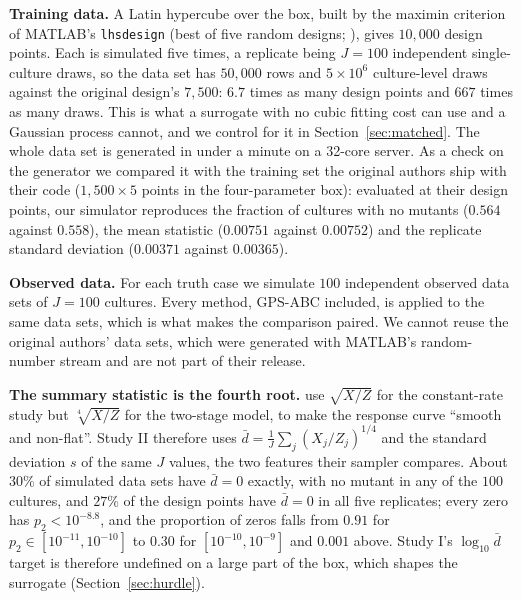 \documentclass[sn-basic,iicol,pdflatex]{sn-jnl}
\begin{document}
\noindent\textbf{Training data.} A Latin hypercube over the box, built by the
maximin criterion of MATLAB's \texttt{lhsdesign} (best of five random designs; \citealp{mckay1979}), gives
$10{,}000$ design points. Each is simulated five times, a replicate being $J=100$
independent single-culture draws, so the data set has $50{,}000$ rows and $5\times10^{6}$
culture-level draws against the original design's $7{,}500$: $6.7$ times as many
design points and $667$ times as many draws. This is what a surrogate with no
cubic fitting cost can use and a Gaussian process cannot, and we control for it
in Section~\ref{sec:matched}. The whole data set is generated in under a minute on
a 32-core server. As a check on the generator
we compared it with the training set the original authors ship with their code
($1{,}500\times5$ points in the four-parameter box): evaluated at their design
points, our simulator reproduces the fraction of cultures with no mutants
($0.564$ against $0.558$), the mean statistic ($0.00751$ against $0.00752$) and
the replicate standard deviation ($0.00371$ against $0.00365$).

\noindent\textbf{Observed data.} For each truth case we simulate $100$ independent
observed data sets of $J=100$ cultures. Every method, GPS-ABC included, is
applied to the same data sets, which is what makes the comparison paired. We
cannot reuse the original authors' data sets, which were generated with
MATLAB's random-number stream and are not part of their release.

\noindent\textbf{The summary statistic is the fourth root.} \citeauthor{lu2023}
use $\sqrt{X/Z}$ for the constant-rate study but $\sqrt[4]{X/Z}$ for the
two-stage model, to make the response curve ``smooth and non-flat''. Study II
therefore uses $\bar d=\frac1J\sum_j(X_j/Z_j)^{1/4}$ and the standard deviation
$s$ of the same $J$ values, the two features their sampler compares. About
$30\%$ of simulated data sets have $\bar d=0$ exactly, with no mutant in any of
the $100$ cultures, and $27\%$ of the design points have $\bar d=0$ in all five
replicates; every zero has $p_2<10^{-8.8}$, and the proportion of zeros falls
from $0.91$ for $p_2\in[10^{-11},10^{-10}]$ to $0.30$ for $[10^{-10},10^{-9}]$ and $0.001$ above. Study I's $\log_{10}\bar d$
target is therefore undefined on a large part of the box, which shapes the
surrogate (Section~\ref{sec:hurdle}).
\end{document}
